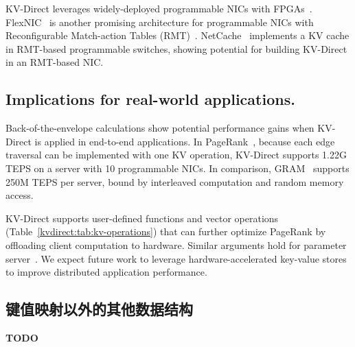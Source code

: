 KV-Direct leverages widely-deployed programmable NICs with FPGAs~\cite{putnam2014reconfigurable,caulfield2016cloud}. FlexNIC~\cite{kaufmann2015flexnic,kaufmann2016krishnamurthy} is another promising architecture for programmable NICs with Reconfigurable Match-action Tables (RMT)~\cite{bosshart2013forwarding}.
NetCache~\cite{netcache-sosp17} implements a KV cache in RMT-based programmable switches, showing potential for building KV-Direct in an RMT-based NIC.

\subsection{Implications for real-world applications.}

Back-of-the-envelope calculations show potential performance gains when KV-Direct is applied in end-to-end applications. In PageRank~\cite{page1999pagerank}, because each edge traversal can be implemented with one KV operation, KV-Direct supports 1.22G TEPS on a server with 10 programmable NICs. In comparison, GRAM~\cite{wu2015g} supports 250M TEPS per server, bound by interleaved computation and random memory access.

KV-Direct supports user-defined functions and vector operations (Table~\ref{kvdirect:tab:kv-operations}) that can further optimize PageRank by offloading client computation to hardware. Similar arguments hold for parameter server~\cite{li2014scaling}. We expect future work to leverage hardware-accelerated key-value stores to improve distributed application performance.

\subsection{键值映射以外的其他数据结构}

\textbf{TODO}